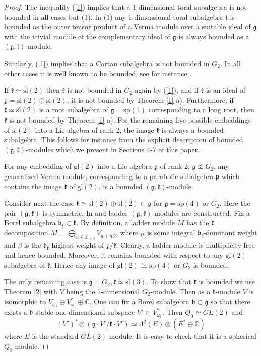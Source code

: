 \documentclass[12pt]{amsart}
\theoremstyle{plain} %
\newcommand{\GL}{{GL}}
\renewcommand{\sl}{\mathrm{sl}}
\newcommand{\gl}{\mathrm{gl}}
\renewcommand{\sp}{\mathrm{sp}}
\newcommand {\ZZ} {\mathbb {Z}}
\newcommand {\CC} {\mathbb {C}}
\newcommand{\kk}{\mathfrak{k}}
\renewcommand{\gg}{\mathfrak{g}}
\newcommand{\bb}{\mathfrak{b}}
\newcommand{\pp}{\mathfrak{p}}
\newcommand{\refth}[1]{Theorem \ref{#1}}
\newcommand{\refeq}[1]{(\ref{#1})}
\begin{document}
\begin{proof} The inequality \refeq{1} implies that a 1-dimensional toral subalgebra is not bounded in all cases but (1). In (1) any 1-dimensional
  toral subalgebra $\mathfrak {t}$ is bounded as the outer tensor
  product of a Verma module over a suitable ideal of $\gg$ with the
  trivial module of the complementary ideal of $\gg$ is always bounded as a
  $(\gg,\mathfrak t)$-module.

Similarly, \refeq{1} implies that a Cartan subalgebra is not bounded in $G_2$. In all other cases it is well known to be bounded, see for instance \cite{F}.

If $\kk \simeq \sl(2)$ then $\kk$ is not bounded in $G_2$ again by
\refeq{1}, and if $\kk$ is an ideal of $\gg=\sl(2)\oplus \sl(2)$, it
is not bounded by  \refth{1} a). Furthermore, if $\kk \simeq \sl(2)$ is
a root subalgebra of $\gg=\sp(4)$ corresponding to a long root, then
$\kk$ is not bounded by \refth{1} a). For the remaining five possible embeddings of $\sl(2)$ into a Lie algebra of rank 2, the image
$\kk$ is always a bounded subalgebra. This follows for instance from
the explicit description of bounded $(\gg,\kk)$-modules which we present in
Sections 4-7 of this paper.

For any embedding of $\gl(2)$ into a Lie algebra $\gg$ of rank 2,
$\gg\ncong G_2$, any generalized Verma module, corresponding to
a parabolic subalgebra $\pp$ which contains the image $\kk$ of
$\gl(2)$, is a bounded $(\gg,\kk)$-module.

Consider next the case $\kk\simeq \sl(2)\oplus \sl(2)\subset \gg$ for $\gg=\sp(4)$
or $G_2$. Here the pair $(\gg,\kk)$ is symmetric. In
\cite{V1} and \cite{V3} ladder $(\gg,\kk)$-modules are
constructed. Fix a Borel subalgebra $\bb_{\kk}\subset \kk$. By
definition, a ladder module $M$ has the $\kk$
decomposition $M=\bigoplus_{n\in \ZZ_{\geq 0}}V_{\mu + n\beta}$, where
$\mu$ is some integral $\bb_{\kk}$-dominant weight and $\beta$ is
the $\bb_{\kk}$-highest weight of $\gg/{\kk}$. Clearly, a ladder
module is multiplicity-free and hence bounded. Moreover, it remains bounded with respect to any
$\gl(2)$-subalgebra of $\kk$. Hence any image of $\gl(2)$ in $\sp(4)$
or $G_2$ is bounded.

The only remaining case is $\gg=G_2, \kk\simeq \sl(3)$. To show that $\kk$ is bounded we use \refth{2} with $V$ being the 7-dimensional $G_2$-module. Then as a $\kk$-module $V$ is isomorphic to $V_{\omega_1}\oplus V^*_{\omega_1}\oplus \CC$. One can fix a Borel subalgebra $\bb\subset \gg$ so that there exists a $\bb$-stable one-dimensional subspace $V'\subset
V_{\omega_1}^*$. Then $Q_0\simeq \GL(2)$ and
$$(V')^*\otimes (\gg\cdot V'/\kk\cdot V')\simeq \Lambda^2(E)\otimes (E^*\oplus \mathbb C)$$
where $E$ is the standard $GL(2)$-module. It is easy to check that it 
is a spherical $Q_0$-module.
\end{proof}
\end{document}
